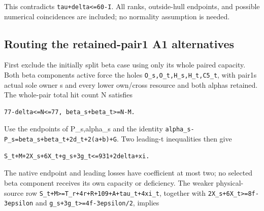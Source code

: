 \documentclass[10pt,a4paper]{article}
\theoremstyle{definition}
\begin{document}
This contradicts \texttt{tau+\allowbreak{}delta<=\allowbreak{}60-I}. All ranks,\allowbreak{}
outside-hull endpoints,\allowbreak{} and possible numerical coincidences are
included; no normality assumption is needed.

\hypertarget{routing-the-retained-pair1-a1-alternatives}{%
\subsection{Routing the retained-pair1 A1
alternatives}\label{routing-the-retained-pair1-a1-alternatives}}

First exclude the initially split beta case using only its whole paired
capacity. Both beta components active force the holes
\texttt{O\_\allowbreak{}\allowbreak{}s,\allowbreak{}O\_\allowbreak{}\allowbreak{}t,\allowbreak{}H\_\allowbreak{}\allowbreak{}s,\allowbreak{}H\_\allowbreak{}\allowbreak{}t,\allowbreak{}C5\_\allowbreak{}\allowbreak{}t},\allowbreak{} with
pair1\textquotesingle s actual sole owner s and every lower own/cross
resource and both alphas retained. The whole-pair total hit count N
satisfies

\begin{lstlisting}
77-delta<=N<=77, beta_s+beta_t>=N-M.
\end{lstlisting}

Use the endpoints of P\_\allowbreak{}s,\allowbreak{}alpha\_\allowbreak{}s and the identity
\texttt{alpha\_\allowbreak{}\allowbreak{}s-P\_\allowbreak{}\allowbreak{}s=\allowbreak{}beta\_\allowbreak{}\allowbreak{}s+\allowbreak{}beta\_\allowbreak{}\allowbreak{}t+\allowbreak{}2d\_\allowbreak{}\allowbreak{}t+\allowbreak{}2(a+\allowbreak{}b)+\allowbreak{}G}.
Two leading-t inequalities then give

\begin{lstlisting}
S_t+M+2X_s+6X_t+g_s+3g_t<=931+2delta+xi.
\end{lstlisting}

The native endpoint and leading losses have coefficient at most two; no
selected beta component receives its own capacity or deficiency. The
weaker physical-source row
\texttt{S\_\allowbreak{}\allowbreak{}t+\allowbreak{}M>=\allowbreak{}T\_\allowbreak{}\allowbreak{}r+\allowbreak{}4r+\allowbreak{}R+\allowbreak{}109+\allowbreak{}A+\allowbreak{}tau\_\allowbreak{}\allowbreak{}t+\allowbreak{}4xi\_\allowbreak{}\allowbreak{}t},\allowbreak{}
together with \texttt{2X\_\allowbreak{}\allowbreak{}s+\allowbreak{}6X\_\allowbreak{}\allowbreak{}t>=\allowbreak{}8f-3epsilon} and
\texttt{g\_\allowbreak{}\allowbreak{}s+\allowbreak{}3g\_\allowbreak{}\allowbreak{}t>=\allowbreak{}4f-3epsilon/\allowbreak{}2},\allowbreak{} implies
\end{document}
